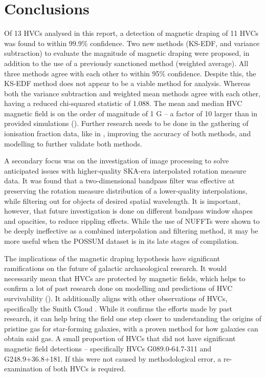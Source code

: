 \chapter{Conclusions}
\label{cha:conclusion}

Of 13 HVCs analysed in this report, a detection of magnetic draping of 11 HVCs was found to within 99.9\% confidence. Two new methods (KS-EDF, and variance subtraction) to evaluate the magnitude of magnetic draping were proposed, in addition to the use of a previously sanctioned method (weighted average). All three methods agree with each other to within 95\% confidence. Despite this, the KS-EDF method does not appear to be a viable method for analysis. Whereas both the variance subtraction and weighted mean methods agree with each other, having a reduced chi-squared statistic of 1.088. The mean and median HVC magnetic field is on the order of magnitude of 1 \textmu G – a factor of 10 larger than in provided simulations (\citeauthor[][simulations]{ID23}). Further research needs to be done in the gathering of ionisation fraction data, like in \cite{ID67}, improving the accuracy of both methods, and modelling to further validate both methods.

A secondary focus was on the investigation of image processing to solve anticipated issues with higher-quality SKA-era interpolated rotation measure data. It was found that a two-dimensional bandpass filter was effective at preserving the rotation measure distribution of a lower-quality interpolations, while filtering out for objects of desired spatial wavelength. It is important, however, that future investigation is done on different bandpass window shapes and opacities, to reduce rippling effects. While the use of NUFFTs were shown to be deeply ineffective as a combined interpolation and filtering method, it may be more useful when the POSSUM dataset is in its late stages of compilation.

The implications of the magnetic draping hypothesis have significant ramifications on the future of galactic archaeological research. It would necessarily mean that HVCs are protected by magnetic fields, which helps to confirm a lot of past research done on modelling and predictions of HVC survivability (\citeauthor[][simulations]{ID23}). It additionally aligns with other observations of HVCs, specifically the Smith Cloud \citep{ID5, ID26}. While it confirms the efforts made by past research, it can help bring the field one step closer to understanding the origins of pristine gas for star-forming galaxies, with a proven method for how galaxies can obtain said gas. A small proportion of HVCs that did not have significant magnetic field detections – specifically HVCs G089.0-64.7-311 and G248.9+36.8+181. If this were not caused by methodological error, a re-examination of both HVCs is required.

